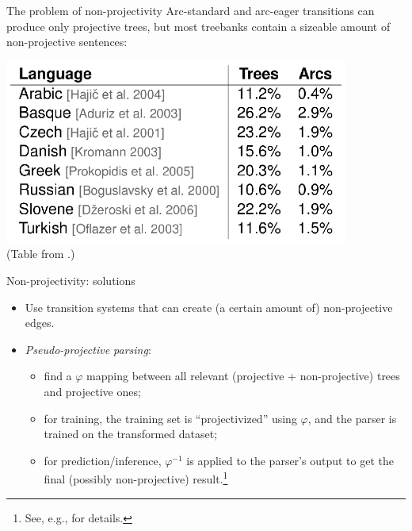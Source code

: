 \documentclass[style=upen, size=14pt]{powerdot}
\newcommand{\gold}{\color{arany}}
\theoremstyle{definition}
\begin{document}
\begin{slide}[toc=Non-projectivity]{The problem of non-projectivity}
  Arc-standard and arc-eager transitions can produce only projective trees, but
  most treebanks contain a sizeable amount of non-projective sentences:
  \begin{center}
    \includegraphics[width=0.85\textwidth]{figures/non-projectivity.eps}\\
    \footnotesize{(Table from \cite{nivre2013beyond}.)}
  \end{center}
\end{slide}

\begin{slide}[toc=]{Non-projectivity: solutions}
  \begin{itemize}
  \item Use transition systems that can create (a certain amount of)
    non-projective edges.
  \item \emph{\gold Pseudo-projective parsing}:
    \begin{itemize}
    \item find a $\varphi$ mapping between all relevant (projective +
      non-projective) trees and projective ones;
    \item for training, the training set is ``projectivized'' using $\varphi$,
      and the parser is trained on the transformed dataset;
    \item for prediction/inference, $\varphi^{-1}$ is applied to the parser's
      output to get the final (possibly non-projective) result.\footnote{See,
        e.g., \cite{nivre-nilsson-2005-pseudo} for details.}
    \end{itemize}
  \end{itemize}
\end{slide}
\end{document}
